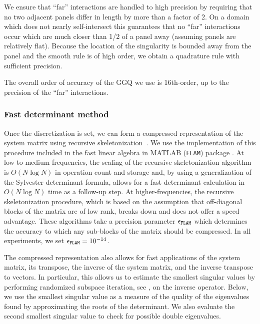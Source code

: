 \begin{remark}
  \label{rmk:levelrestrict}
  We ensure that ``far'' interactions
  are handled to high precision by requiring that
  no two adjacent panels differ in length
  by more than a factor of 2. On a domain which does
  not nearly self-intersect this
  guarantees that no ``far'' interactions occur
  which are much closer than 1/2 of a panel away
  (assuming panels are relatively flat).
  Because the location of the singularity is
  bounded away from the panel and the smooth
  rule is of high order, we obtain a quadrature
  rule with sufficient precision.

  The overall order of accuracy of the GGQ we use
  is {\color{red}16th-order}, up to the precision of the ``far''
  interactions.
\end{remark}

\subsubsection{Fast determinant method}

Once the discretization is set, we can form
a compressed representation of the system matrix
using recursive skeletonization~\cite{ho2012fast}.
%
We use the implementation of this procedure
included in the fast linear algebra in
MATLAB (\texttt{FLAM}) package
\cite{hoFLAM_1253582}.
%
At low-to-medium frequencies, the scaling
of the recursive skeletonization algorithm
is $O(N\log N)$ in operation count and
storage and, by using a generalization
of the Sylvester determinant formula,
allows for a fast determinant
calculation in $O(N\log N)$ time as a
follow-up step.
%
At higher-frequencies,
the recursive skeletonization procedure,
which is based on the assumption that off-diagonal
blocks of the matrix are of low rank,
breaks down and does not offer a speed advantage.
%
These algorithms take a precision parameter
${\epsilon_{\texttt{FLAM}}}$ which determines the
accuracy to which any sub-blocks of the matrix
should be compressed. In all experiments,
we set ${\epsilon_{\texttt{FLAM}}} = 10^{-14}$.

The compressed representation also allows
for fast applications of the system matrix,
its transpose, the inverse of the system
matrix, and the inverse transpose to
vectors.
%
In particular, this allows us to estimate the
smallest singular values by performing
randomized subspace iteration, see
\cite[Algorithm 4.4]{halko2011finding},
on the inverse operator.
%
Below, we use the smallest singular value
as a measure of the quality of the
eigenvalues found by approximating the
roots of the determinant.
%
We also evaluate the second smallest singular
value to check for possible double eigenvalues.

